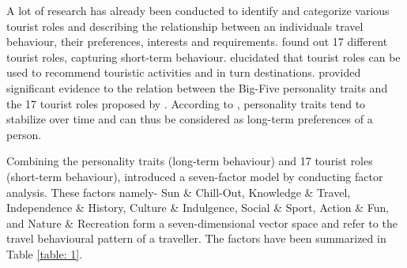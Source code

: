 A lot of research has already been conducted to identify and categorize various tourist roles and describing the relationship between an individual\textquotesingle s travel behaviour, their preferences, interests and requirements. \cite{gibson2002tourist} found out 17 different tourist roles, capturing short-term behaviour. \cite{gretzel2006travel} elucidated that tourist roles can be used to recommend touristic activities and in turn destinations. \cite{delic2016sun} provided significant evidence to the relation between the Big-Five personality traits \cite{goldberg1990alternative} and the 17 tourist roles proposed by \cite{gibson2002tourist}. According to \cite{woszczynski2002exploring}, personality traits tend to stabilize over time and can thus be considered as long-term preferences of a person.

Combining the personality traits (long-term behaviour) and 17 tourist roles (short-term behaviour), \cite{neidhardt2014eliciting}\cite{neidhardt2015picture} introduced a seven-factor model by conducting factor analysis. These factors namely- Sun \& Chill-Out, Knowledge \& Travel, Independence \& History, Culture \& Indulgence, Social \& Sport, Action \& Fun, and Nature \& Recreation form a seven-dimensional vector space and refer to the travel behavioural pattern of a traveller. The factors have been summarized in Table \ref{table: 1}.

        
